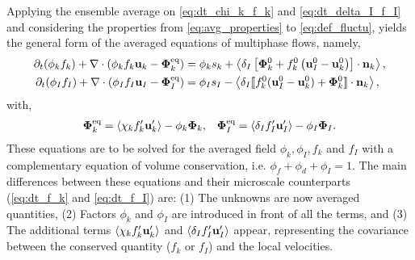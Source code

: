 Applying the ensemble average on \ref{eq:dt_chi_k_f_k} and \ref{eq:dt_delta_I_f_I} and considering the properties from \ref{eq:avg_properties} to \ref{eq:def_fluctu}, yields the general form of the averaged equations of multiphase flows, namely,
\begin{align}
    \partial_t (\phi_k f_k)
    +\mathbf{\nabla}\cdot (\phi_k f_k \textbf{u}_k - \mathbf{\Phi}_k^\text{eq})
    &= 
    \phi_k s_k
    + \left<\delta_I\left[
        \mathbf{\Phi}_k^0
        + f_k^0
        \left(
            \textbf{u}_I^0
            - \textbf{u}_k^0
        \right)
    \right]
    \cdot \textbf{n}_k\right> ,
    \label{eq:avg_dt_chi_f}\\
    \partial_t (\phi_I f_I)
    +\mathbf{\nabla}\cdot (\phi_I f_I \textbf{u}_I- \mathbf{\Phi}_{I}^\text{eq})
    &= 
    \phi_I s_I
    - \left<\delta_I 
    \llbracket 
    f_k^0 (\textbf{u}_I^0 - \textbf{u}_k^0)
    + \mathbf{\Phi}_k^0
     \rrbracket \cdot \textbf{n}_k 
     \right>,
    \label{eq:avg_dt_delta_f}
\end{align}
with, 
\begin{align*}
    \mathbf{\Phi}_k^\text{eq}
    = \left<\chi_k f_k' \textbf{u}_k'\right>
    - \phi_k \bm\Phi_k,
    &&
    \mathbf{\Phi}_{I}^\text{eq}
    = \left<\delta_I f_I' \textbf{u}_I'\right>
    - \phi_I \bm\Phi_I. 
\end{align*}
These equations are to be solved for the averaged field $\phi_k,\phi_I,f_k$ and $f_I$ with a complementary equation of volume conservation, i.e. $\phi_f+\phi_d+\phi_I = 1$.
The main differences between these equations and their microscale counterparts (\ref{eq:dt_f_k} and \ref{eq:dt_f_I}) are:
(1) The unknowns are now averaged quantities,
(2) Factors $\phi_k$ and $\phi_I$ are introduced in front of all the terms, and
(3) The additional terms $\left<\chi_k f_k' \textbf{u}_k'\right>$ and $\left<\delta_I f_I' \textbf{u}_I'\right>$ appear, representing the covariance between the conserved quantity ($f_k$ or $f_I$) and the local velocities.  


